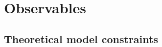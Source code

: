 \documentclass[preprint,3p,12pt]{elsarticle}
\begin{document}
\section{Observables}
\label{sec:Observables}

\subsection{Theoretical model constraints}
\label{sec:theoryconstraints}







\end{document}
